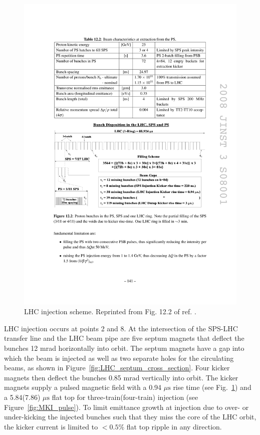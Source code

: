 \documentclass[dissertation.tex]{subfiles}
\begin{document}
\begin{figure}
	\centering
	\includegraphics[scale=1.0]{LHC_injection_scheme}
	\caption{LHC injection scheme.  Reprinted from Fig. 12.2 of ref. \cite{1748-0221-3-08-S08001}.}
	\label{fig:LHC_injection_scheme}
\end{figure}

LHC injection occurs at points 2 and 8.  At the intersection of the SPS-LHC transfer line and the LHC beam pipe are five septum magnets that deflect the bunches 12 mrad horizontally into orbit.  The septum magnets have a gap into which the beam is injected as well as two separate holes for the circulating beams, as shown in Figure~\ref{fig:LHC_septum_cross_section}.  Four kicker magnets then deflect the bunches 0.85 mrad vertically into orbit.  The kicker magnets supply a pulsed magnetic field with a 0.94 $\mu\mbox{s}$ rise time (see Fig.~\ref{fig:LHC_injection_scheme}) and a 5.84(7.86) $\mu\mbox{s}$ flat top for three-train(four-train) injection (see Figure~\ref{fig:MKI_pulse}).  To limit emittance growth at injection due to over- or under-kicking the injected bunches such that they miss the core of the LHC orbit, the kicker current is limited to $<0.5\%$ flat top ripple in any direction.
\end{document}
